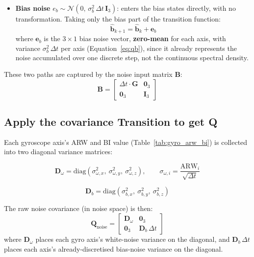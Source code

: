 \documentclass[12pt,a4paper]{article}
\newcommand{\bG}{\bm{G}}
\newcommand{\bQ}{\bm{Q}}
\begin{document}
{\begin{itemize}
  \item \textbf{Bias noise} $e_b \sim \mathcal{N}(0,\,\sigma_b^2\,\Delta t\,\bm{I}_3)$:
        enters the bias states directly, with no transformation.
        Taking only the bias part of the transition function:
        \begin{equation}
          \hat{\bm{b}}_{k+1} = \hat{\bm{b}}_k + \bm{e}_b
          \label{eq:predict_bias_noise}
        \end{equation}
        where $\bm{e}_b$ is the $3\times 1$ bias noise vector,
        \textbf{zero-mean} for each axis, with variance
        $\sigma_b^2\,\Delta t$ per axis (Equation~\eqref{eq:qb}),
        since it already represents the noise accumulated over one
        discrete step, not the continuous spectral density.
\end{itemize}

These two paths are captured by the noise input matrix $\bm{B}$:
\begin{equation}
  \bm{B} =
  \begin{bmatrix}
    \Delta t \cdot \bG & \bm{0}_3 \\
    \bm{0}_3 & \bm{I}_3
  \end{bmatrix}
  \label{eq:B}
\end{equation}

\subsection{Apply the covariance Transition to get  Q}

Each gyroscope axis's ARW and BI value (Table~\ref{tab:gyro_arw_bi})
is collected into two diagonal variance matrices:

\begin{equation}
  \bm{D}_\omega =
  \mathrm{diag}\!\left(\sigma_{\omega,x}^2,\ \sigma_{\omega,y}^2,\ \sigma_{\omega,z}^2\right),
  \qquad
  \sigma_{\omega,i} = \frac{\mathrm{ARW}_i}{\sqrt{\Delta t}}
  \label{eq:D_omega}
\end{equation}

\begin{equation}
  \bm{D}_b =
  \mathrm{diag}\!\left(\sigma_{b,x}^2,\ \sigma_{b,y}^2,\ \sigma_{b,z}^2\right)
  \label{eq:D_b}
\end{equation}

The raw noise covariance (in noise space) is then:
\begin{equation}
  \bQ_\text{noise} =
  \begin{bmatrix}
    \bm{D}_\omega & \bm{0}_3 \\
    \bm{0}_3 & \bm{D}_b\,\Delta t
  \end{bmatrix}
  \label{eq:Qnoise}
\end{equation}
where $\bm{D}_\omega$ places each gyro axis's white-noise variance
on the diagonal, and $\bm{D}_b\,\Delta t$ places each axis's
already-discretised bias-noise variance on the diagonal.

}
\end{document}
